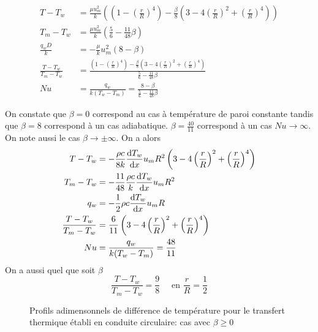 \documentclass[a4paper,11pt]{report}
\newcommand{\recip}[1]{\frac{1}{#1}}
\begin{document}
      \begin{equation}
        \begin{aligned}
          T-T_w &= \frac{\mu u_m^2}{k} \left( \left(1-\left(\frac{r}{R}\right)^4\right) - \frac{\beta}{8} \left(3-4\left(\frac{r}{R}\right)^2 + \left(\frac{r}{R}\right)^4\right)\right)\\
          T_m -T_w &= \frac{\mu u_m^2}{k} \left(\frac{5}{6} - \frac{11}{48}\beta\right)\\
          \frac{q_w D}{k} &= - \frac{\mu}{k} u_m^2 (8-\beta)\\
          \frac{T-T_w}{T_m - T_w} &= \frac{\left(1-\left(\frac{r}{R}\right)^4\right) - \frac{\beta}{8} \left(3-4\left(\frac{r}{R}\right)^2 + \left(\frac{r}{R}\right)^4\right)}{\frac{5}{6} - \frac{11}{48}\beta}\\
          Nu &= \frac{q_w}{k(T_w - T_m)} = \frac{8-\beta}{\frac{5}{6} - \frac{11}{48}\beta}
        \end{aligned}
      \end{equation}

      On constate que $\beta=0$ correspond au cas à température de paroi constante tandis que $\beta=8$ correspond à un cas adiabatique. $\beta=\frac{40}{11}$ correspond à un cas $Nu \rightarrow \infty$. On note aussi le cas $\beta \rightarrow \pm \infty$. On a alors
      \begin{equation}
        \begin{aligned}
          T-T_w &= -\frac{\rho c}{8k} \dv{T_w}{x} u_m R^2 \left(3-4\left(\frac{r}{R}\right)^2 + \left(\frac{r}{R}\right)^4\right)\\
          T_m -T_w &= - \frac{11}{48} \frac{\rho c}{k} \dv{T_w}{x} u_m R^2 \\
          q_w &= -\recip{2} \rho c \dv{T_w}{x} u_m R\\
          \frac{T-T_w}{T_m - T_w} &= \frac{6}{11}\left(3-4\left(\frac{r}{R}\right)^2 + \left(\frac{r}{R}\right)^4\right)\\
          Nu &= \frac{q_w}{k(T_w - T_m)} = \frac{48}{11}
        \end{aligned}
      \end{equation}
      On a aussi quel que soit $\beta$
      \begin{equation}
        \frac{T-T_w}{T_m-T_w} = \frac{9}{8} \quad \textrm{ en } \frac{r}{R} = \recip{2}
      \end{equation}

      \begin{figure}[!h]
        \centering
        
        \caption{Profils adimensonnels de différence de température pour le transfert thermique établi en conduite circulaire: cas avec $\beta \geq 0$}
        \label{fig:profilDiffTempNeg}
      \end{figure}
\end{document}
